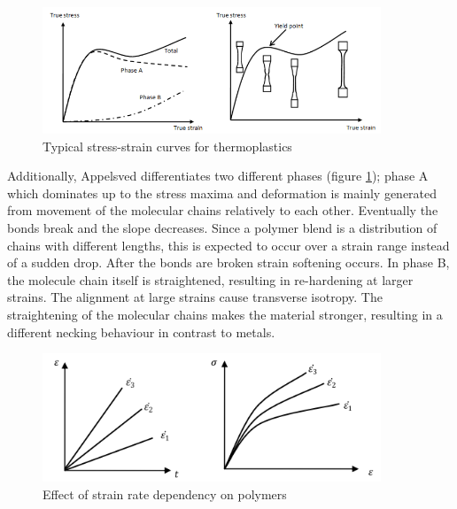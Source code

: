 \begin{figure}[htb]
    \centering
    \includegraphics[width=0.9\textwidth]{chapter_2/figures/SSpolymers.PNG}
    \caption{Typical stress-strain curves for thermoplastics \cite{Appelsved2012InvestigationModels}}
    \label{fig:SSpolymers}
\end{figure}
Additionally, Appelsved differentiates two different phases (figure \ref{fig:SSpolymers}); phase A which dominates up to the stress maxima and deformation is mainly generated from movement of the molecular chains relatively to each other. Eventually the bonds break and the slope decreases. Since a polymer blend is a distribution of chains with different lengths, this is expected to occur over a strain range instead of a sudden drop. After the bonds are broken strain softening occurs. In phase B, the molecule chain itself is straightened, resulting in re-hardening at larger strains. The alignment at large strains cause transverse isotropy. The straightening of the molecular chains makes the material stronger, resulting in a different necking behaviour in contrast to metals. 

\begin{figure}[htb]
    \centering
    \includegraphics[width=0.9\textwidth]{chapter_2/figures/Strainrate.PNG}
    \caption{Effect of strain rate dependency on polymers \cite{Appelsved2012InvestigationModels}}
    \label{fig:Strainrate}
\end{figure}
